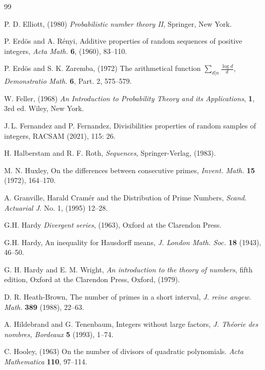 \documentclass[11pt,draft,reqno]{amsart}
\theoremstyle{definition}
\theoremstyle{remarks}
\numberwithin{equation}{section}
\begin{document}
\begin{thebibliography}{99}
 
    P. D.  Elliott,   (1980) \emph{Probabilistic number theory
II}, Springer, New York.  
 
 
  P. Erd\"os and A. R\'enyi, Additive properties of random sequences of positive integers, \emph{Acta Math.} {\bf 6}, (1960), 83--110.


  P. Erd\"os and S. K. Zaremba, (1972) The arithmetical function $\sum_{d|n} \frac{\log d}{d}$,
\emph{Demonstratio Math.} {\bf 6}, Part. 2,  575--579.


  {W. Feller}, (1968)   \emph{An Introduction to Probability Theory  and its Applications}, {\bf 1}, 3rd ed. Wiley,  New York. 


   J.\,L. Fernandez and  P.  Fernandez, 
  Divisibilities properties of random samples of integers, RACSAM (2021), 115: 26. 
  
  
 

  {  H. Halberstam and  R. F. Roth},   \emph{Sequences}, Springer-Verlag, (1983).
 
 
   M. N. Huxley, On the differences between consecutive primes, \emph{Invent. Math.} {\bf 15} (1972), 164--170.

   A. Granville, Harald Cram\'er and the Distribution of Prime Numbers, \emph{Scand. Actuarial J.}    No. 1, (1995) 12--28.



   G.H. Hardy  \emph{Divergent series}, (1963), Oxford at the Clarendon
Press.
  
    G.H. Hardy,   An inequality for Hausdorff means, \emph{J. London Math. Soc.} {\bf 18}  (1943), 46--50.

   {G. H. Hardy and E. M. Wright},     \emph{An introduction to the theory of numbers}, fifth edition, Oxford at the Clarendon Press, Oxford, (1979).
 
   D. R. Heath-Brown, The number of primes in a short interval, \emph{J. reine angew. Math.} {\bf 389} (1988), 22--63. 
 
  A. Hildebrand and G. Tenenbaum, Integers without large factors, \emph{J. Th\'eorie des nombres, Bordeaux} {\bf 5} (1993), 1--74.  

 C. Hooley, (1963) On the number of divisors of quadratic polynomials. \emph{Acta Mathematica} {\bf 110},
97--114.


\end{thebibliography}
\end{document}
